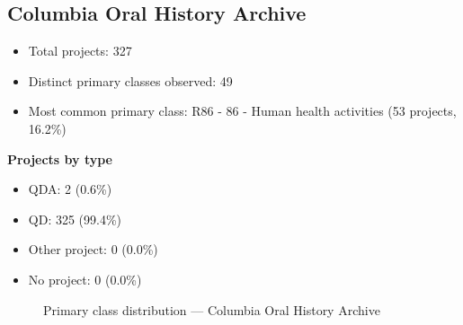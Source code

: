 \subsection{Columbia Oral History Archive}

\begin{itemize}
    \item Total projects: 327
    \item Distinct primary classes observed: 49
    \item Most common primary class: R86 - 86 - Human health activities (53 projects, 16.2\%)
\end{itemize}
\textbf{Projects by type}
\begin{itemize}
    \item QDA: 2 (0.6\%)
    \item QD: 325 (99.4\%)
    \item Other project: 0 (0.0\%)
    \item No project: 0 (0.0\%)
\end{itemize}

\begin{figure}[H]
    \centering
    
    \caption{Primary class distribution --- Columbia Oral History Archive}
\end{figure}


